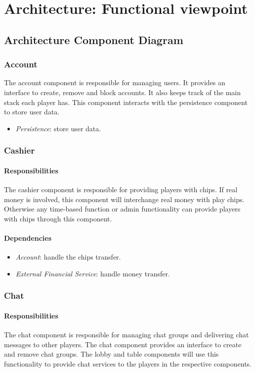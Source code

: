 \documentclass[a4paper,11pt]{report}
\begin{document}
\chapter{Architecture: Functional viewpoint}
\section{Architecture Component Diagram}
\subsection{Account}
The account component is responsible for managing users. It provides an interface to create, remove and block accounts. It also keeps track of the main stack each player has. This component interacts with the persistence component to store user data. 

\begin{itemize}
\item \emph{Persistence}: store user data.
\end{itemize}

\subsection{Cashier}
\subsubsection{Responsibilities}
The cashier component is responsible for providing players with chips. If real money is involved, this component will interchange real money with play chips. Otherwise any time-based function or admin functionality can provide players with chips through this component.
\subsubsection{Dependencies}
\begin{itemize}
\item \emph{Account}: handle the chips transfer.
\item \emph{External Financial Service}: handle money transfer.
\end{itemize}
\subsection{Chat}
\subsubsection{Responsibilities}
The chat component is responsible for managing chat groups and delivering chat messages to other players. The chat component provides an interface to create and remove chat groups. The lobby and table components will use this functionality to provide chat services to the players in the respective components.
\end{document}
